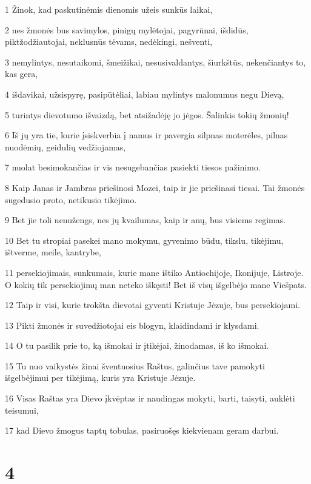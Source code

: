 \par 1 Žinok, kad paskutinėmis dienomis užeis sunkūs laikai, 
\par 2 nes žmonės bus savimylos, pinigų mylėtojai, pagyrūnai, išdidūs, piktžodžiautojai, neklusnūs tėvams, nedėkingi, nešventi, 
\par 3 nemylintys, nesutaikomi, šmeižikai, nesusivaldantys, šiurkštūs, nekenčiantys to, kas gera, 
\par 4 išdavikai, užsispyrę, pasipūtėliai, labiau mylintys malonumus negu Dievą, 
\par 5 turintys dievotumo išvaizdą, bet atsižadėję jo jėgos. Šalinkis tokių žmonių! 
\par 6 Iš jų yra tie, kurie įsiskverbia į namus ir pavergia silpnas moterėles, pilnas nuodėmių, geidulių vedžiojamas, 
\par 7 nuolat besimokančias ir vis nesugebančias pasiekti tiesos pažinimo. 
\par 8 Kaip Janas ir Jambras priešinosi Mozei, taip ir jie priešinasi tiesai. Tai žmonės sugedusio proto, netikusio tikėjimo. 
\par 9 Bet jie toli nenužengs, nes jų kvailumas, kaip ir anų, bus visiems regimas. 
\par 10 Bet tu stropiai pasekei mano mokymu, gyvenimo būdu, tikslu, tikėjimu, ištverme, meile, kantrybe, 
\par 11 persekiojimais, sunkumais, kurie mane ištiko Antiochijoje, Ikonijuje, Listroje. O kokių tik persekiojimų man neteko iškęsti! Bet iš visų išgelbėjo mane Viešpats. 
\par 12 Taip ir visi, kurie trokšta dievotai gyventi Kristuje Jėzuje, bus persekiojami. 
\par 13 Pikti žmonės ir suvedžiotojai eis blogyn, klaidindami ir klysdami. 
\par 14 O tu pasilik prie to, ką išmokai ir įtikėjai, žinodamas, iš ko išmokai. 
\par 15 Tu nuo vaikystės žinai šventuosius Raštus, galinčius tave pamokyti išgelbėjimui per tikėjimą, kuris yra Kristuje Jėzuje. 
\par 16 Visas Raštas yra Dievo įkvėptas ir naudingas mokyti, barti, taisyti, auklėti teisumui, 
\par 17 kad Dievo žmogus taptų tobulas, pasiruošęs kiekvienam geram darbui.


\chapter{4}


